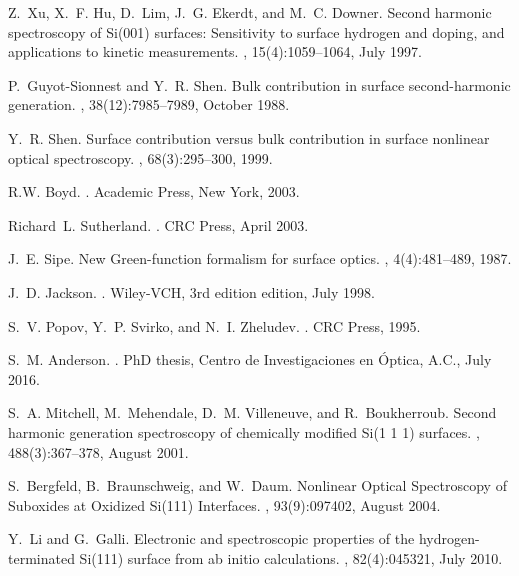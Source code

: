 \documentclass[aps,prb,10pt,showpacs,letterpaper,twocolumn]{revtex4-1}
\begin{document}
\begin{thebibliography}{10}
Z.~Xu, X.~F. Hu, D.~Lim, J.~G. Ekerdt, and M.~C. Downer.
\newblock Second harmonic spectroscopy of {Si}(001) surfaces: {Sensitivity} to
  surface hydrogen and doping, and applications to kinetic measurements.
, 15(4):1059--1064, July 1997.

P.~Guyot-Sionnest and Y.~R. Shen.
\newblock Bulk contribution in surface second-harmonic generation.
, 38(12):7985--7989, October 1988.

Y.~R. Shen.
\newblock Surface contribution versus bulk contribution in surface nonlinear
  optical spectroscopy.
, 68(3):295--300, 1999.

R.W. Boyd.
.
\newblock Academic Press, New York, 2003.

Richard~L. Sutherland.
.
\newblock CRC Press, April 2003.

J.~E. Sipe.
\newblock New {Green}-function formalism for surface optics.
, 4(4):481--489,
  1987.

J.~D. Jackson.
.
\newblock Wiley-VCH, 3rd edition edition, July 1998.

S.~V. Popov, Y.~P. Svirko, and N.~I. Zheludev.
.
\newblock CRC Press, 1995.

S.~M. Anderson.
.
\newblock PhD thesis, Centro de Investigaciones en \'Optica, A.C., July 2016.

S.~A. Mitchell, M.~Mehendale, D.~M. Villeneuve, and R.~Boukherroub.
\newblock Second harmonic generation spectroscopy of chemically modified {Si}(1
  1 1) surfaces.
, 488(3):367--378, August 2001.

S.~Bergfeld, B.~Braunschweig, and W.~Daum.
\newblock Nonlinear {Optical} {Spectroscopy} of {Suboxides} at {Oxidized}
  {Si}(111) {Interfaces}.
, 93(9):097402, August 2004.

Y.~Li and G.~Galli.
\newblock Electronic and spectroscopic properties of the hydrogen-terminated
  {Si}(111) surface from ab initio calculations.
, 82(4):045321, July 2010.


\end{thebibliography}
\end{document}
